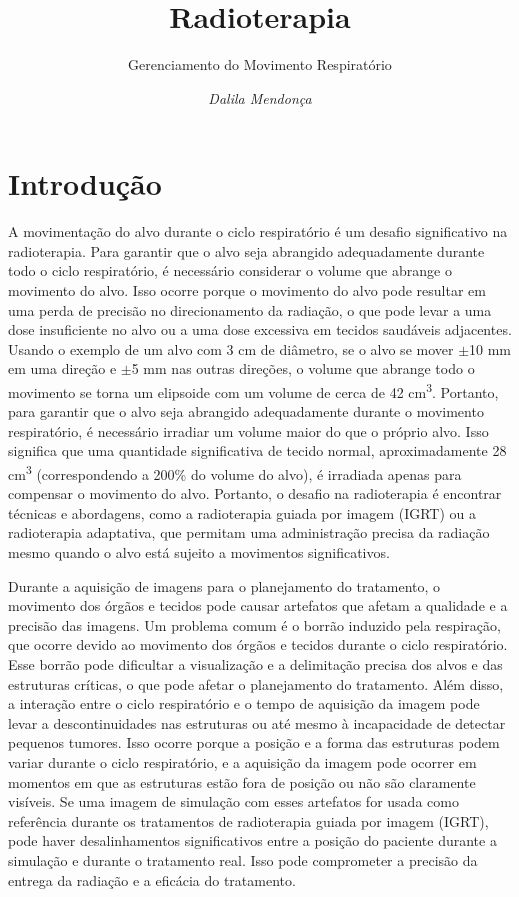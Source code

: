 \documentclass[11pt,a4paper]{article}
\title{\LobsterTwo\Huge{Radioterapia}}
\author{\LobsterTwo\Large{Gerenciamento do Movimento Respiratório}\nocite{*}}
\date{\LobsterTwo\textit{Dalila Mendonça}}
\newcounter{exemplo}
\begin{document}
	\maketitle

\section{Introdução}

	A movimentação do alvo durante o ciclo respiratório é um desafio significativo na radioterapia. Para garantir que o alvo seja abrangido adequadamente durante todo o ciclo respiratório, é necessário considerar o volume que abrange o movimento do alvo. Isso ocorre porque o movimento do alvo pode resultar em uma perda de precisão no direcionamento da radiação, o que pode levar a uma dose insuficiente no alvo ou a uma dose excessiva em tecidos saudáveis adjacentes. Usando o exemplo de um alvo com 3 cm de diâmetro, se o alvo se mover $\pm$10 mm em uma direção e $\pm$5 mm nas outras direções, o volume que abrange todo o movimento se torna um elipsoide com um volume de cerca de 42 \unit{cm^3}. Portanto, para garantir que o alvo seja abrangido adequadamente durante o movimento respiratório, é necessário irradiar um volume maior do que o próprio alvo. Isso significa que uma quantidade significativa de tecido normal, aproximadamente 28 \unit{cm^3} (correspondendo a 200\% do volume do alvo), é irradiada apenas para compensar o movimento do alvo. Portanto, o desafio na radioterapia é encontrar técnicas e abordagens, como a radioterapia guiada por imagem (IGRT) ou a radioterapia adaptativa, que permitam uma administração precisa da radiação mesmo quando o alvo está sujeito a movimentos significativos.

	Durante a aquisição de imagens para o planejamento do tratamento, o movimento dos órgãos e tecidos pode causar artefatos que afetam a qualidade e a precisão das imagens. Um problema comum é o borrão induzido pela respiração, que ocorre devido ao movimento dos órgãos e tecidos durante o ciclo respiratório. Esse borrão pode dificultar a visualização e a delimitação precisa dos alvos e das estruturas críticas, o que pode afetar o planejamento do tratamento. Além disso, a interação entre o ciclo respiratório e o tempo de aquisição da imagem pode levar a descontinuidades nas estruturas ou até mesmo à incapacidade de detectar pequenos tumores. Isso ocorre porque a posição e a forma das estruturas podem variar durante o ciclo respiratório, e a aquisição da imagem pode ocorrer em momentos em que as estruturas estão fora de posição ou não são claramente visíveis. Se uma imagem de simulação com esses artefatos for usada como referência durante os tratamentos de radioterapia guiada por imagem (IGRT), pode haver desalinhamentos significativos entre a posição do paciente durante a simulação e durante o tratamento real. Isso pode comprometer a precisão da entrega da radiação e a eficácia do tratamento.
\end{document}
